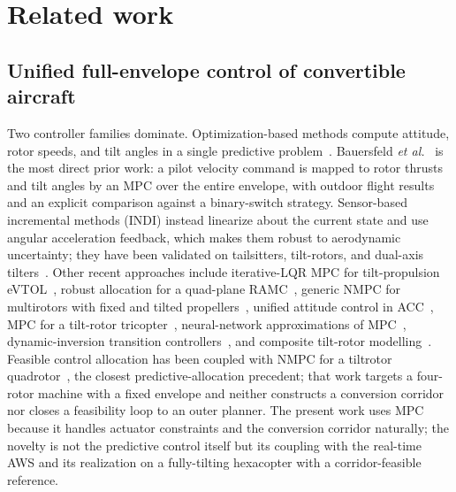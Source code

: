 \documentclass[preprint,3p,11pt]{elsarticle}
\begin{document}
\section{Related work}\label{sec:related}

\subsection{Unified full-envelope control of convertible aircraft}
Two controller families dominate. Optimization-based methods compute
attitude, rotor speeds, and tilt angles in a single predictive
problem~\cite{bauersfeld2021mpc,allenspach2021nmpc,rohr2021nmpc,chen2024unified}.
Bauersfeld \emph{et al.}~\cite{bauersfeld2021mpc} is the most direct prior
work: a pilot velocity command is mapped to rotor thrusts and tilt angles by
an MPC over the entire envelope, with outdoor flight results and an explicit
comparison against a binary-switch strategy. Sensor-based incremental methods
(INDI) instead linearize about the current state and use angular acceleration
feedback, which makes them robust to aerodynamic uncertainty; they have been
validated on tailsitters, tilt-rotors, and dual-axis
tilters~\cite{smeur2020incremental,smeur2018cascaded,smeur2016adaptive,wang2019stability,mancinelli2025unified,bhardwaj2018integrated,lovell2023tailsitter,sun2021incremental}.
Other recent approaches include iterative-LQR MPC for tilt-propulsion
eVTOL~\cite{xia2022ilqr}, robust allocation for a quad-plane
RAMC~\cite{cardoso2020ramc}, generic NMPC for multirotors with fixed and tilted
propellers~\cite{bicego2020nmpc}, unified attitude control in
ACC~\cite{belak2023unified}, MPC for a tilt-rotor tricopter~\cite{prach2018mpc},
neural-network approximations of MPC~\cite{ducard2024neural,jiang2022nnmpc},
dynamic-inversion transition
controllers~\cite{saetti2025dynamic,jeong2025longitudinal,li2026asynchronous},
and composite tilt-rotor modelling~\cite{liang2024composite}. Feasible control
allocation has been coupled with NMPC for a tiltrotor
quadrotor~\cite{shayan2024nmpc}, the closest predictive-allocation precedent;
that work targets a four-rotor machine with a fixed envelope and neither
constructs a conversion corridor nor closes a feasibility loop to an outer
planner. The present work uses MPC because it handles actuator constraints and
the conversion corridor naturally; the novelty is not the predictive control
itself but its coupling with the real-time AWS and its realization on a
fully-tilting hexacopter with a corridor-feasible reference.
\end{document}
